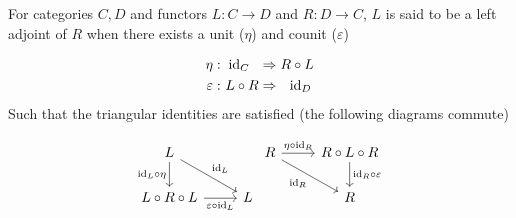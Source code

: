 \begin{definition}
  For categories $C,D$ and functors $L: C\to D$ and $R: D\to C$, $L$ is said to
  be a left adjoint of $R$ when there exists a unit ($\eta$) and counit
  ($\varepsilon$)

  \[
    \begin{aligned}
      \eta&:\\
      \varepsilon&:
    \end{aligned}
    \ \begin{aligned}
      \mathrm{id}_C\ \ &\Rightarrow R \circ L\\
      L \circ R &\Rightarrow\ \ \mathrm{id}_D
    \end{aligned}
  \]
  Such that the triangular identities are satisfied (the following diagrams
  commute)

  \[\begin{tikzcd} L \\
    {L\circ R\circ L} & L
    \arrow["{\id_L\circ\eta}"', from=1-1, to=2-1]
    \arrow["{\varepsilon\circ \id_L}"', from=2-1, to=2-2]
    \arrow["{\id_L}", from=1-1, to=2-2]
  \end{tikzcd}
  \begin{tikzcd}
    R & {R\circ L\circ R} \\
    & R
    \arrow["{\eta\circ\id_R}", from=1-1, to=1-2]
    \arrow["{\id_R \circ \varepsilon}", from=1-2, to=2-2]
    \arrow["{\id_R}"', from=1-1, to=2-2]
  \end{tikzcd}\]
\end{definition}

